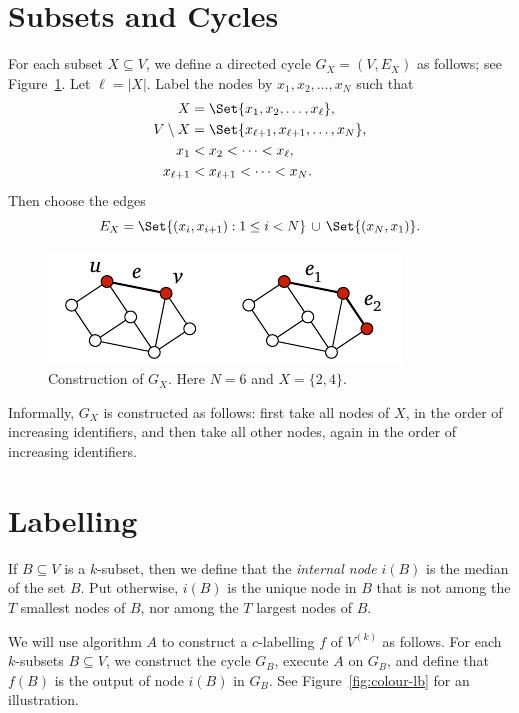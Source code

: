 \section{Subsets and Cycles}

For each subset $X \subseteq V$, we define a directed cycle $G_X = (V,E_X)$ as follows; see Figure~\ref{fig:subset-cycle}. Let $\ell = |X|$. Label the nodes by $x_1, x_2, \dotsc, x_N$ such that
\begin{align*}
    X &= \Set{ x_1, x_2, \dotsc, x_{\ell} }, \\
    V \setminus X &= \Set{ x_{\ell+1}, x_{\ell+1}, \dotsc, x_N }, \\
    x_1 &< x_2 < \dotsb < x_{\ell}, \\
    x_{\ell+1} &< x_{\ell+1} < \dotsb < x_N.
\end{align*}
Then choose the edges
\[
    E_X = \Set{ (x_i, x_{i+1}) : 1 \le i < N } \, \cup \, \Set{ (x_N,x_1) }.
\]

\begin{figure}
    \centering
    \includegraphics[page=\PSubsetCycle]{figs.pdf}
    \caption{Construction of $G_X$. Here $N = 6$ and $X = \{2,4\}$.}\label{fig:subset-cycle}
\end{figure}

Informally, $G_X$ is constructed as follows: first take all nodes of $X$, in the order of increasing identifiers, and then take all other nodes, again in the order of increasing identifiers.


\section{Labelling}

If $B \subseteq V$ is a $k$-subset, then we define that the \emph{internal node} $i(B)$ is the median of the set $B$. Put otherwise, $i(B)$ is the unique node in $B$ that is not among the $T$ smallest nodes of $B$, nor among the $T$ largest nodes of $B$.

We will use algorithm $A$ to construct a $c$-labelling $f$ of $V^{(k)}$ as follows. For each $k$-subsets $B \subseteq V$, we construct the cycle $G_B$, execute $A$ on $G_B$, and define that $f(B)$ is the output of node $i(B)$ in $G_B$. See Figure~\ref{fig:colour-lb} for an illustration.

